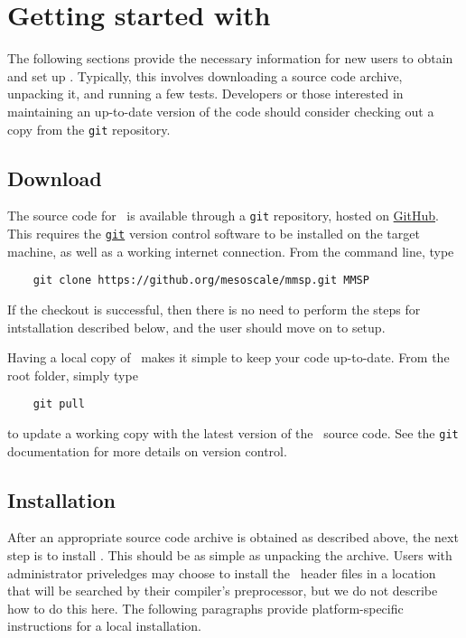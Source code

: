 
\chapter{Getting started with \MMSP}
The following sections provide the necessary information for new users to obtain and set up \MMSP.  Typically, this involves downloading a source code archive, unpacking it, and running a few tests.  Developers or those interested in maintaining an up-to-date version of the code should consider checking out a copy from the {\tt git} repository.

\section{Download}
The source code for \MMSP\ is available through a {\tt git} repository, hosted on \href{https://github.com/mesoscale/mmsp}{GitHub}.  This requires the \href{http://www.git-scm.com}{\tt git} version control software to be installed on the target machine, as well as a working internet connection.  From the command line, type
\begin{shadebox}
\begin{verbatim}
    git clone https://github.org/mesoscale/mmsp.git MMSP
\end{verbatim}
\end{shadebox}
If the checkout is successful, then there is no need to perform the steps for intstallation described below, and the user should move on to setup.

Having a local copy of \MMSP\ makes it simple to keep your code up-to-date.  From the root folder, simply type
\begin{shadebox}
\begin{verbatim}
    git pull
\end{verbatim}
\end{shadebox}
to update a working copy with the latest version of the \MMSP\ source code.  See the {\tt git} documentation for more details on version control.

\section{Installation}
After an appropriate source code archive is obtained as described above, the next step is to install \MMSP.  This should be as simple as unpacking the archive.  Users with administrator priveledges may choose to install the \MMSP\ header files in a location that will be searched by their compiler's preprocessor, but we do not describe how to do this here.  The following paragraphs provide platform-specific instructions for a local installation.

